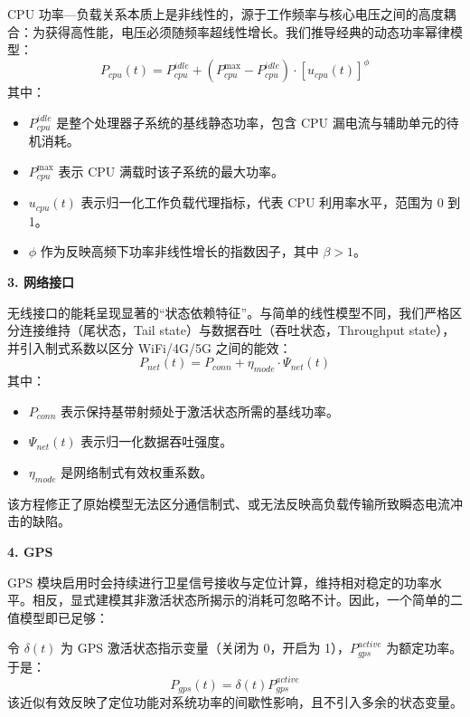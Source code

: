 \documentclass[11pt,a4paper]{ctexart}
\begin{document}
CPU 功率—负载关系本质上是非线性的，源于工作频率与核心电压之间的高度耦合：为获得高性能，电压必须随频率超线性增长\cite{greaves2012}。我们推导经典的动态功率幂律模型：
\begin{equation}
P_{cpu}(t) = P_{cpu}^{idle} + \left(P_{cpu}^{\max} - P_{cpu}^{idle}\right)\cdot [u_{cpu}(t)]^{\phi}
\end{equation}
其中：

\begin{itemize}[leftmargin=2em]
\item $P_{cpu}^{idle}$ 是整个处理器子系统的基线静态功率，包含 CPU 漏电流与辅助单元的待机消耗。
\item $P_{cpu}^{\max}$ 表示 CPU 满载时该子系统的最大功率。
\item $u_{cpu}(t)$ 表示归一化工作负载代理指标，代表 CPU 利用率水平，范围为 0 到 1。
\item $\phi$ 作为反映高频下功率非线性增长的指数因子\cite{pathak2012}，其中 $\beta>1$。
\end{itemize}

\noindent\textbf{3. 网络接口}

无线接口的能耗呈现显著的“状态依赖特征”。与简单的线性模型不同，我们严格区分连接维持（尾状态，Tail state）与数据吞吐（吞吐状态，Throughput state），并引入制式系数以区分 WiFi/4G/5G 之间的能效：
\begin{equation}
P_{net}(t) = P_{conn} + \eta_{mode}\cdot\Psi_{net}(t)
\end{equation}
其中：

\begin{itemize}[leftmargin=2em]
\item $P_{conn}$ 表示保持基带射频处于激活状态所需的基线功率。
\item $\Psi_{net}(t)$ 表示归一化数据吞吐强度。
\item $\eta_{mode}$ 是网络制式有效权重系数\cite{liu2023}。
\end{itemize}

该方程修正了原始模型无法区分通信制式、或无法反映高负载传输所致瞬态电流冲击的缺陷。

\noindent\textbf{4. GPS}

GPS 模块启用时会持续进行卫星信号接收与定位计算，维持相对稳定的功率水平。相反，显式建模其非激活状态所揭示的消耗可忽略不计。因此，一个简单的二值模型即已足够：

令 $\delta(t)$ 为 GPS 激活状态指示变量（关闭为 0，开启为 1），$P_{gps}^{active}$ 为额定功率。于是：
\begin{equation}
P_{gps}(t) = \delta(t)P_{gps}^{active}
\end{equation}
该近似有效反映了定位功能对系统功率的间歇性影响，且不引入多余的状态变量。
\end{document}
